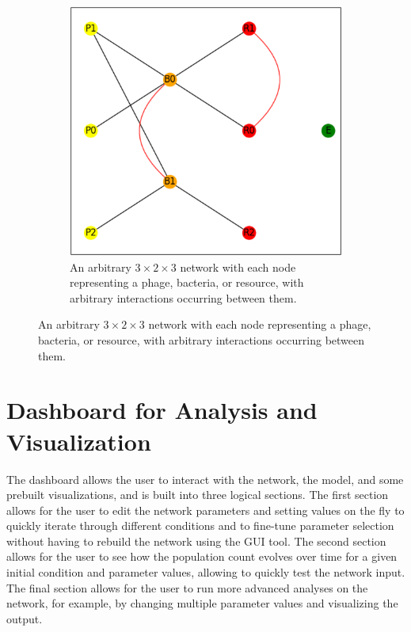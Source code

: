 \begin{figure}
\begin{subfigure}{0.49\linewidth}
        \includegraphics[width=\linewidth]{Screenshots/example_network.png}
        \caption{
            An arbitrary $3\times2\times3$ network with each node representing a phage, bacteria, or resource, with arbitrary interactions occurring between them. 
        }
        \vspace*{\fill}
        \label{fig:ss:example_network}
    \end{subfigure} 
 \end{figure}

\section{Dashboard for Analysis and Visualization}
The dashboard allows the user to interact with the network, the model, and some prebuilt visualizations, and is built into three logical sections.
The first section allows for the user to edit the network parameters and setting values on the fly to quickly iterate through different conditions and to fine-tune parameter selection without having to rebuild the network using the GUI tool.
The second section allows for the user to see how the population count evolves over time for a given initial condition and parameter values, allowing to quickly test the network input.
The final section allows for the user to run more advanced analyses on the network, for example, by changing multiple parameter values and visualizing the output. 

